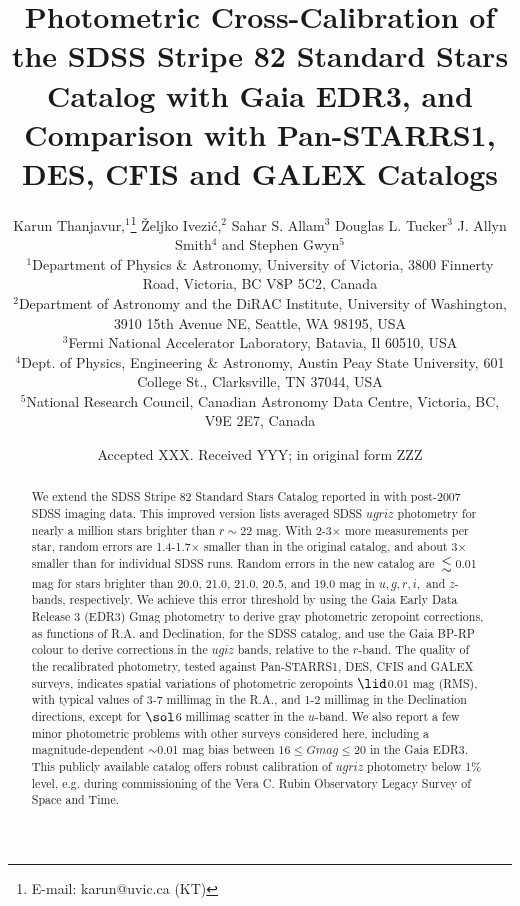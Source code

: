 \documentclass[fleqn,usenatbib]{mnras}
\title[SDSS Stripe 82 Standard Stars Catalog: New and Improved]{Photometric Cross-Calibration
of the SDSS Stripe 82 Standard Stars Catalog with Gaia EDR3, and Comparison with Pan-STARRS1, DES, 
CFIS and GALEX Catalogs}
\author[K. Thanjavur et al.]{
Karun Thanjavur,$^{1}$\thanks{E-mail: karun@uvic.ca (KT)}
\v{Z}eljko Ivezi\'{c},$^{2}$
Sahar S. Allam$^{3}$
Douglas L. Tucker$^{3}$
J. Allyn Smith$^{4}$
and Stephen Gwyn$^{5}$
\\
$^{1}$Department of Physics \& Astronomy, University of Victoria, 3800 Finnerty Road, Victoria, BC V8P 5C2, Canada\\
$^{2}$Department of Astronomy and the DiRAC Institute, University of Washington, 3910 15th Avenue NE, Seattle, WA 98195, USA\\
$^{3}$Fermi National Accelerator Laboratory, Batavia, Il 60510, USA\\
$^{4}$Dept. of Physics, Engineering \& Astronomy, Austin Peay State University, 601 College St., Clarksville, TN 37044, USA\\
$^{5}$National Research Council, Canadian Astronomy Data Centre, Victoria, BC, V9E 2E7, Canada
}
\date{Accepted XXX. Received YYY; in original form ZZZ}
\begin{document}
\label{firstpage}
\pagerange{\pageref{firstpage}--\pageref{lastpage}}
\maketitle

\begin{abstract}

\noindent We extend the SDSS Stripe 82 Standard Stars Catalog reported in \citet{Ivez07} with post-2007 SDSS imaging data. This improved version lists averaged SDSS $ugriz$ photometry for nearly a million stars brighter than $r\sim22$ mag. With 2-3$\times$ more measurements per star, random errors are 1.4-1.7$\times$ smaller than in the original catalog, and about 3$\times$ smaller than for individual SDSS runs. Random errors in the new catalog are $\la$0.01 mag for stars brighter than 20.0, 21.0, 21.0, 20.5, and 19.0 mag in $u,g,r,i,$ and $z$-bands, respectively. We achieve this error threshold by using the Gaia Early Data Release 3 (EDR3) Gmag photometry to derive gray photometric zeropoint corrections, as functions of R.A. and Declination, for the SDSS catalog, and use the Gaia BP-RP colour to derive corrections in the $ugiz$ bands, relative to the $r$-band. The quality of the recalibrated photometry, tested against Pan-STARRS1, DES, CFIS and GALEX surveys, indicates spatial variations of photometric zeropoints $\lid$0.01 mag (RMS), with typical values of 3-7 millimag in the R.A., and 1-2 millimag in the Declination directions, except for $\sol$6 millimag scatter in the $u$-band. We also report a few minor photometric problems with other surveys considered here, including a magnitude-dependent $\sim$0.01 mag bias between $16 \leq Gmag \leq 20$ in the Gaia EDR3. This publicly available catalog offers robust calibration of $ugriz$ photometry below 1\% level, e.g. during commissioning of the Vera C. Rubin Observatory Legacy Survey of Space and Time.



\end{abstract}
\end{document}
